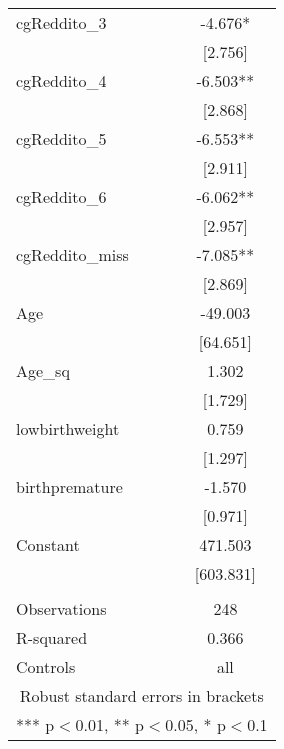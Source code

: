 \documentclass[]{article}
\begin{document}
\begin{tabular}{lc}
cgReddito\_3 & -4.676* \\
 & [2.756] \\
cgReddito\_4 & -6.503** \\
 & [2.868] \\
cgReddito\_5 & -6.553** \\
 & [2.911] \\
cgReddito\_6 & -6.062** \\
 & [2.957] \\
cgReddito\_miss & -7.085** \\
 & [2.869] \\
Age & -49.003 \\
 & [64.651] \\
Age\_sq & 1.302 \\
 & [1.729] \\
lowbirthweight & 0.759 \\
 & [1.297] \\
birthpremature & -1.570 \\
 & [0.971] \\
Constant & 471.503 \\
 & [603.831] \\
 &  \\
Observations & 248 \\
R-squared & 0.366 \\
 Controls & all \\ \hline
\multicolumn{2}{c}{ Robust standard errors in brackets} \\
\multicolumn{2}{c}{ *** p$<$0.01, ** p$<$0.05, * p$<$0.1} \\
\end{tabular}
\end{document}

